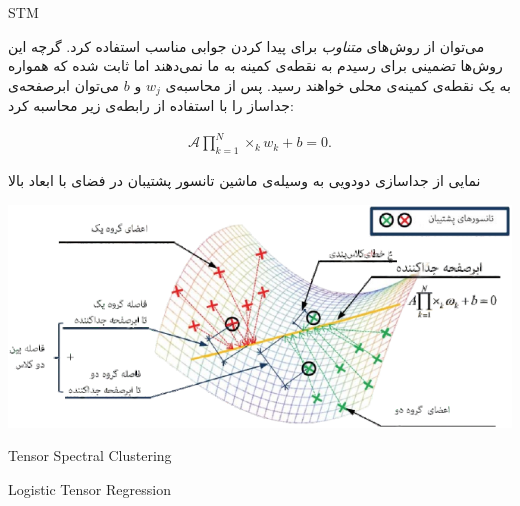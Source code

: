 \begin{frame}{STM}
\small{
 	می‌توان از روش‌های 
	\textit{متناوب}
	برای پیدا کردن جوابی مناسب استفاده کرد. گرچه این روش‌ها تضمینی برای رسیدم به نقطه‌ی کمینه به ما نمی‌دهند اما ثابت شده که همواره به یک نقطه‌ی کمینه‌ی محلی خواهند رسید. پس از محاسبه‌ی 
	$w_j$ و
	$b$
	می‌توان ابرصفحه‌ی جداساز را با استفاده از رابطه‌ی زیر محاسبه کرد:
	
	\pause
	\begin{align*}
	\mathcal{A}\prod_{k=1}^{N} \times_k w_k + b = 0.
	\end{align*}
}
\end{frame}
\begin{frame}
\small{
	نمایی از جداسازی دودویی  به وسیله‌ی ماشین تانسور پشتیبان در فضای با ابعاد بالا 

}
	\includegraphics[width=1\textwidth]{img/ok/STM.pdf}

\end{frame}
\begin{frame}[standout]
Tensor Spectral Clustering
\end{frame}
\begin{frame}[standout]
Logistic Tensor Regression
\end{frame}
